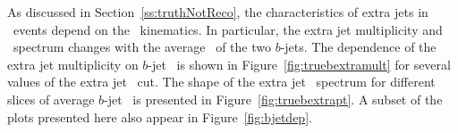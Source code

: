 \label{ss:bpt}
As discussed in Section~\ref{ss:truthNotReco}, the characteristics of extra jets in \ttbar\ events
depend on the \ttbar\ kinematics. In particular, the extra jet multiplicity and \pt\ spectrum
changes with the average \pt\ of the two $b$-jets.  The dependence of the extra jet multiplicity on $b$-jet \pt\ 
is shown in Figure~\ref{fig:truebextramult} for several values of the extra jet \pt\ cut.  The shape
of the extra jet \pt\ spectrum for different slices of average $b$-jet \pt\ is presented
in Figure~\ref{fig:truebextrapt}.
A subset of the plots presented here also appear in Figure~\ref{fig:bjetdep}.
